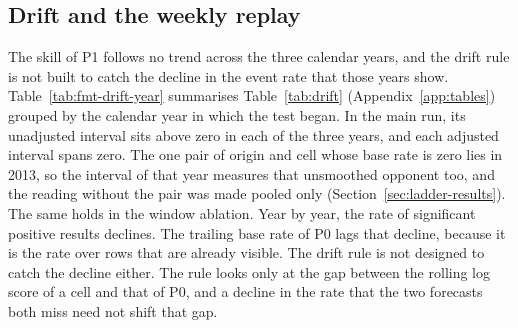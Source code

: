 \subsection{Drift and the weekly replay}
\label{sec:drift-results}
The skill of P1 follows no trend across the three calendar years, and the drift rule is not built to catch the decline in the event rate that those years show. Table~\ref{tab:fmt-drift-year} summarises Table~\ref{tab:drift} (Appendix~\ref{app:tables}) grouped by the calendar year in which the test began. In the main run, its unadjusted interval sits above zero in each of the three years, and each adjusted interval spans zero. The one pair of origin and cell whose base rate is zero lies in 2013, so the interval of that year measures that unsmoothed opponent too, and the reading without the pair was made pooled only (Section~\ref{sec:ladder-results}). The same holds in the window ablation. Year by year, the rate of significant positive results declines. The trailing base rate of P0 lags that decline, because it is the rate over rows that are already visible. The drift rule is not designed to catch the decline either. The rule looks only at the gap between the rolling log score of a cell and that of P0, and a decline in the rate that the two forecasts both miss need not shift that gap.

\begin{table}[t]\centering\scriptsize
\caption{The prior grouped by the calendar year in which the test started, on the headline archive, taken from Table~\ref{tab:drift} (Appendix~\ref{app:tables}). The columns give tests, the Brier skill of P1, that same interval adjusted for the 156 intervals in the by-year family, which covers every cell and model that is scored rather than only the rows displayed in Table~\ref{tab:drift}, and the rate of significant positive results. The 2013 tests belong to the burn-in origin, with the excluded window taken out.}
\label{tab:fmt-drift-year}

\end{table}

